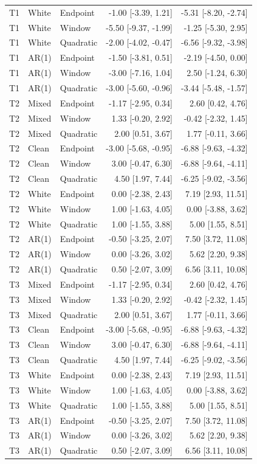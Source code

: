 \documentclass[10pt]{article}
\begin{document}
\begin{longtable}{lllrr}
T1 & White & Endpoint & -1.00 [-3.39, 1.21] & -5.31 [-8.20, -2.74] \\
T1 & White & Window & -5.50 [-9.37, -1.99] & -1.25 [-5.30, 2.95] \\
T1 & White & Quadratic & -2.00 [-4.02, -0.47] & -6.56 [-9.32, -3.98] \\
T1 & AR(1) & Endpoint & -1.50 [-3.81, 0.51] & -2.19 [-4.50, 0.00] \\
T1 & AR(1) & Window & -3.00 [-7.16, 1.04] & 2.50 [-1.24, 6.30] \\
T1 & AR(1) & Quadratic & -3.00 [-5.60, -0.96] & -3.44 [-5.48, -1.57] \\
T2 & Mixed & Endpoint & -1.17 [-2.95, 0.34] & 2.60 [0.42, 4.76] \\
T2 & Mixed & Window & 1.33 [-0.20, 2.92] & -0.42 [-2.32, 1.45] \\
T2 & Mixed & Quadratic & 2.00 [0.51, 3.67] & 1.77 [-0.11, 3.66] \\
T2 & Clean & Endpoint & -3.00 [-5.68, -0.95] & -6.88 [-9.63, -4.32] \\
T2 & Clean & Window & 3.00 [-0.47, 6.30] & -6.88 [-9.64, -4.11] \\
T2 & Clean & Quadratic & 4.50 [1.97, 7.44] & -6.25 [-9.02, -3.56] \\
T2 & White & Endpoint & 0.00 [-2.38, 2.43] & 7.19 [2.93, 11.51] \\
T2 & White & Window & 1.00 [-1.63, 4.05] & 0.00 [-3.88, 3.62] \\
T2 & White & Quadratic & 1.00 [-1.55, 3.88] & 5.00 [1.55, 8.51] \\
T2 & AR(1) & Endpoint & -0.50 [-3.25, 2.07] & 7.50 [3.72, 11.08] \\
T2 & AR(1) & Window & 0.00 [-3.26, 3.02] & 5.62 [2.20, 9.38] \\
T2 & AR(1) & Quadratic & 0.50 [-2.07, 3.09] & 6.56 [3.11, 10.08] \\
T3 & Mixed & Endpoint & -1.17 [-2.95, 0.34] & 2.60 [0.42, 4.76] \\
T3 & Mixed & Window & 1.33 [-0.20, 2.92] & -0.42 [-2.32, 1.45] \\
T3 & Mixed & Quadratic & 2.00 [0.51, 3.67] & 1.77 [-0.11, 3.66] \\
T3 & Clean & Endpoint & -3.00 [-5.68, -0.95] & -6.88 [-9.63, -4.32] \\
T3 & Clean & Window & 3.00 [-0.47, 6.30] & -6.88 [-9.64, -4.11] \\
T3 & Clean & Quadratic & 4.50 [1.97, 7.44] & -6.25 [-9.02, -3.56] \\
T3 & White & Endpoint & 0.00 [-2.38, 2.43] & 7.19 [2.93, 11.51] \\
T3 & White & Window & 1.00 [-1.63, 4.05] & 0.00 [-3.88, 3.62] \\
T3 & White & Quadratic & 1.00 [-1.55, 3.88] & 5.00 [1.55, 8.51] \\
T3 & AR(1) & Endpoint & -0.50 [-3.25, 2.07] & 7.50 [3.72, 11.08] \\
T3 & AR(1) & Window & 0.00 [-3.26, 3.02] & 5.62 [2.20, 9.38] \\
T3 & AR(1) & Quadratic & 0.50 [-2.07, 3.09] & 6.56 [3.11, 10.08] \\
\bottomrule\end{longtable}\endgroup
\end{document}
